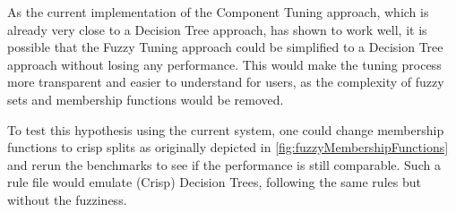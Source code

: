 As the current implementation of the Component Tuning approach, which is already very close to a Decision Tree approach, has shown to work well, it is possible that the Fuzzy Tuning approach could be simplified to a Decision Tree approach without losing any performance. This would make the tuning process more transparent and easier to understand for users, as the complexity of fuzzy sets and membership functions would be removed.

To test this hypothesis using the current system, one could change membership functions to crisp splits as originally depicted in \autoref{fig:fuzzyMembershipFunctions} and rerun the benchmarks to see if the performance is still comparable. Such a rule file would emulate (Crisp) Decision Trees, following the same rules but without the fuzziness.